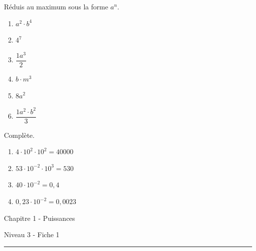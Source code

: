 \begin{exercise}
  Réduis au maximum sous la forme $a^n$.
  \begin{enumerate}[cols=3]
    \item \(a^2 \cdot b^4 \)
    \item \(4^7\)
    \item \(\dfrac{1{a}^{3}}{2} \)
    \item \(b \cdot m^{3}\)
    \item \(8a^{2}\)
    \item \(\dfrac{1{a}^{2} \cdot b^{2}}{3} \)
  \end{enumerate}
\end{exercise}

\begin{exercise}
  Complète.
  \begin{enumerate}[cols=2]
    \item \(4 \cdot 10^{2} \cdot 10^{2} = 40000\)
    \item \(53 \cdot 10^{-2} \cdot 10^{3} = 530\)
    \item \(40 \cdot 10^{-2} = 0,4\)
    \item \(0,23 \cdot 10^{-2} = 0,0023\)
  \end{enumerate}
\end{exercise}


\newpage
\begin{center}
  \bfseries
  \begin{Huge}
    Chapitre 1 - Puissances
  \end{Huge}
  \smallbreak
  \begin{large}
    Niveau 3  - Fiche 1
  \end{large}
  \smallbreak
  \rule[10pt]{.5\linewidth}{1 pt}
\end{center}

\setcounter{exercise}{0}

